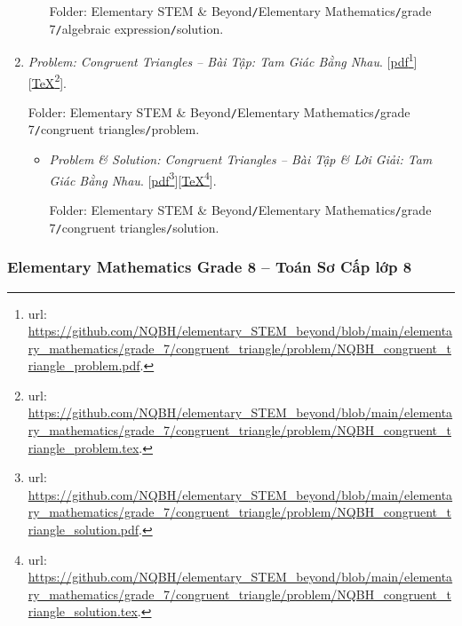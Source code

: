 \documentclass[12pt,oneside]{book}
\begin{document}
\begin{enumerate}
\begin{itemize}
		Folder: {\sf Elementary STEM \& Beyond{\tt/}Elementary Mathematics{\tt/}grade 7{\tt/}algebraic expression{\tt/}solution}.
	\end{itemize}
	\item {\it Problem: Congruent Triangles -- Bài Tập: Tam Giác Bằng Nhau}. [\href{https://github.com/NQBH/elementary_STEM_beyond/blob/main/elementary_mathematics/grade_7/congruent_triangle/problem/NQBH_congruent_triangle_problem.pdf}{pdf}\footnote{{\sc url}: \url{https://github.com/NQBH/elementary_STEM_beyond/blob/main/elementary_mathematics/grade_7/congruent_triangle/problem/NQBH_congruent_triangle_problem.pdf}.}][\href{https://github.com/NQBH/elementary_STEM_beyond/blob/main/elementary_mathematics/grade_7/congruent_triangle/problem/NQBH_congruent_triangle_problem.tex}{\TeX}\footnote{{\sc url}: \url{https://github.com/NQBH/elementary_STEM_beyond/blob/main/elementary_mathematics/grade_7/congruent_triangle/problem/NQBH_congruent_triangle_problem.tex}.}].
	
	Folder: {\sf Elementary STEM \& Beyond{\tt/}Elementary Mathematics{\tt/}grade 7{\tt/}congruent triangles{\tt/}problem}.
	\begin{itemize}
		\item {\it Problem \& Solution: Congruent Triangles -- Bài Tập \& Lời Giải: Tam Giác Bằng Nhau}. [\href{https://github.com/NQBH/elementary_STEM_beyond/blob/main/elementary_mathematics/grade_7/congruent_triangle/problem/NQBH_congruent_triangle_solution.pdf}{pdf}\footnote{{\sc url}: \url{https://github.com/NQBH/elementary_STEM_beyond/blob/main/elementary_mathematics/grade_7/congruent_triangle/problem/NQBH_congruent_triangle_solution.pdf}.}][\href{https://github.com/NQBH/elementary_STEM_beyond/blob/main/elementary_mathematics/grade_7/congruent_triangle/problem/NQBH_congruent_triangle_solution.tex}{\TeX}\footnote{{\sc url}: \url{https://github.com/NQBH/elementary_STEM_beyond/blob/main/elementary_mathematics/grade_7/congruent_triangle/problem/NQBH_congruent_triangle_solution.tex}.}].
		
		Folder: {\sf Elementary STEM \& Beyond{\tt/}Elementary Mathematics{\tt/}grade 7{\tt/}congruent triangles{\tt/}solution}.
	\end{itemize}
\end{enumerate}

\subsubsection{Elementary Mathematics Grade 8 -- Toán Sơ Cấp lớp 8}
\end{document}

